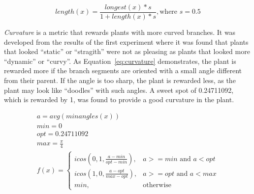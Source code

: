\begin{equation}
\label{eq:length}
    length(x) = \frac{longest(x) * s}{1 + length(x) * s}, \text{where } s = 0.5
\end{equation}

\textit{Curvature} is a metric that rewards plants with more curved branches.
It was developed from the results of the first experiment where it was found that plants that looked ``static'' or ``stragith'' were not as pleasing as plants that looked more ``dynamic'' or ``curvy''.
As Equation~\ref{eq:curvature} demonstrates, the plant is rewarded more if the branch segments are oriented with a small angle different from their parent.
If the angle is too sharp, the plant is rewarded less, as the plant may look like ``doodles'' with such angles.
A sweet spot of 0.24711092, which is rewarded by 1, was found to provide a good curvature in the plant.

\begin{equation}
\label{eq:curvature}
\begin{aligned}
     a = avg(minangles(x))  \\
     min = 0  \\
     opt = 0.24711092  \\
     max = \frac{\pi}{4}  \\
     f(x) =
    \begin{cases}
        icos(0, 1, \frac{a - min}{opt - min}), & a >= min \text{ and } a < opt \\
        icos(1, 0, \frac{a - opt}{max - opt}), & a >= opt \text{ and } a < max \\
        min, & \text{otherwise}
    \end{cases}
\end{aligned}
\end{equation}
